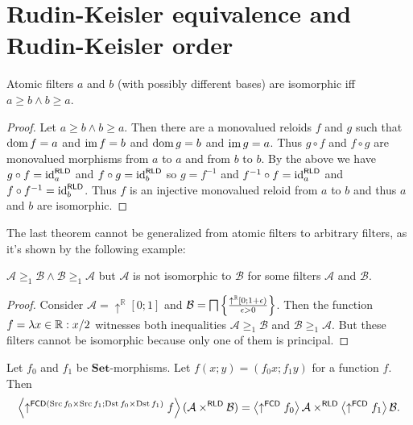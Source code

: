 \section{Rudin-Keisler equivalence and Rudin-Keisler order}
\begin{thm}
Atomic filters $a$ and $b$ (with possibly different bases) are isomorphic
iff $a\ge b\land b\ge a$.\end{thm}
\begin{proof}
Let $a\ge b\land b\ge a$. Then there are a monovalued reloids $f$
and $g$ such that $\operatorname{dom} f=a$ and $\operatorname{im} f=b$ and $\operatorname{dom} g=b$ and
$\operatorname{im} g=a$. Thus $g\circ f$ and $f\circ g$ are monovalued morphisms
from $a$ to $a$ and from $b$ to $b$. By the above we have $g\circ f=\operatorname{id}_{a}^{\mathsf{RLD}}$
and $f\circ g=\operatorname{id}_{b}^{\mathsf{RLD}}$ so $g=f^{-1}$ and $f^{-1}\circ f=\operatorname{id}_{a}^{\mathsf{RLD}}$
and $f\circ f^{-1}=\operatorname{id}_{b}^{\mathsf{RLD}}$. Thus $f$ is an injective
monovalued reloid from $a$ to $b$ and thus $a$ and $b$ are isomorphic.
\end{proof}
The last theorem cannot be generalized from atomic filters to arbitrary
filters, as it's shown by the following example:
\begin{example}
$\mathcal{A}\ge_{1}\mathcal{B}\wedge\mathcal{B}\ge_{1}\mathcal{A}$
but $\mathcal{A}$ is not isomorphic to $\mathcal{B}$ for some filters
$\mathcal{A}$ and $\mathcal{B}$.\end{example}
\begin{proof}
Consider $\mathcal{A}=\uparrow^{\mathbb{R}}[0;1]$ and $\mathcal{B}=\bigsqcap\left\{ \frac{\uparrow^{\mathbb{R}}[0;1+\epsilon)}{\epsilon>0}\right\}$.
Then the function $f=\lambda x\in\mathbb{R}:x/2$ witnesses both
inequalities $\mathcal{A}\ge_{1}\mathcal{B}$ and $\mathcal{B}\ge_{1}\mathcal{A}$.
But these filters cannot be isomorphic because only one of them is
principal.\end{proof}
\begin{lem}
Let $f_{0}$ and $f_{1}$ be $\mathbf{Set}$-morphisms. Let $f(x;y)=(f_{0}x;f_{1}y)$
for a function $f$. Then
\[
\left\langle \uparrow^{\mathsf{FCD}(\operatorname{Src} f_{0}\times\operatorname{Src} f_{1};\operatorname{Dst} f_{0}\times\operatorname{Dst} f_{1})}f\right\rangle(\mathcal{A}\times^{\mathsf{RLD}}\mathcal{B})=\left\langle \uparrow^{\mathsf{FCD}}f_{0}\right\rangle\mathcal{A}\times^{\mathsf{RLD}}\left\langle \uparrow^{\mathsf{FCD}}f_{1}\right\rangle\mathcal{B}.
\]
\end{lem}
